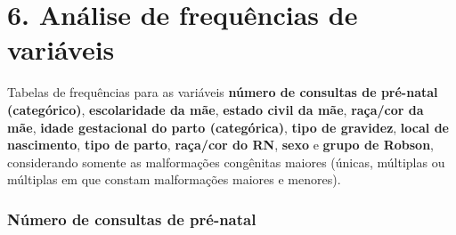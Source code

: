 \documentclass[
]{article}
\newenvironment{Shaded}{\begin{snugshade}}{\end{snugshade}}
\newcommand{\AttributeTok}[1]{\textcolor[rgb]{0.13,0.29,0.53}{#1}}
\newcommand{\ConstantTok}[1]{\textcolor[rgb]{0.56,0.35,0.01}{#1}}
\newcommand{\DecValTok}[1]{\textcolor[rgb]{0.00,0.00,0.81}{#1}}
\newcommand{\FunctionTok}[1]{\textcolor[rgb]{0.13,0.29,0.53}{\textbf{#1}}}
\newcommand{\NormalTok}[1]{#1}
\newcommand{\OtherTok}[1]{\textcolor[rgb]{0.56,0.35,0.01}{#1}}
\newcommand{\SpecialCharTok}[1]{\textcolor[rgb]{0.81,0.36,0.00}{\textbf{#1}}}
\newcommand{\StringTok}[1]{\textcolor[rgb]{0.31,0.60,0.02}{#1}}
\begin{document}
\newpage

\hypertarget{anuxe1lise-de-frequuxeancias-de-variuxe1veis}{%
\section{6. Análise de frequências de
variáveis}\label{anuxe1lise-de-frequuxeancias-de-variuxe1veis}}

Tabelas de frequências para as variáveis \textbf{número de consultas de
pré-natal (categórico)}, \textbf{escolaridade da mãe}, \textbf{estado
civil da mãe}, \textbf{raça/cor da mãe}, \textbf{idade gestacional do
parto (categórica)}, \textbf{tipo de gravidez}, \textbf{local de
nascimento}, \textbf{tipo de parto}, \textbf{raça/cor do RN},
\textbf{sexo} e \textbf{grupo de Robson}, considerando somente as
malformações congênitas maiores (únicas, múltiplas ou múltiplas em que
constam malformações maiores e menores).

\hypertarget{nuxfamero-de-consultas-de-pruxe9-natal}{%
\subsubsection{Número de consultas de
pré-natal}\label{nuxfamero-de-consultas-de-pruxe9-natal}}

\begin{Shaded}
\end{Shaded}
\end{document}
